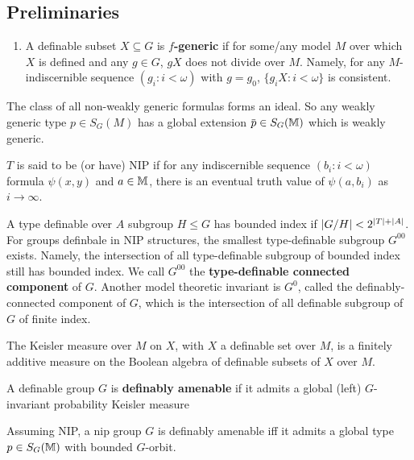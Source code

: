 \documentclass[11pt]{article}
\begin{document}
\subsection{Preliminaries}
\label{sec:org010ea45}
\begin{definition}[]
\begin{enumerate}
\item A definable subset \(X\subseteq G\) is  \textbf{\(f\)-generic} if for some/any model \(M\) over which \(X\) is
defined and any \(g\in G\), \(gX\) does not divide over \(M\). Namely, for
any \(M\)-indiscernible sequence \((g_i:i<\omega)\) with \(g=g_0\), \(\{g_iX:i<\omega\}\)  is consistent.
\end{enumerate}
\end{definition}

\begin{remark}
The class of all non-weakly generic formulas forms an ideal. So any weakly generic
type \(p\in S_G(M)\) has a global extension \(\barp\in S_G(\M)\) which is weakly generic.
\end{remark}

\(T\) is said to be (or have) NIP if for any indiscernible sequence \((b_i:i<\omega)\)
formula \(\psi(x,y)\) and \(a\in\mathbb{M}\), there is an eventual truth value of \(\psi(a,b_i)\) as \(i\to\infty\).

A type definable over \(A\) subgroup \(H\le G\) has bounded index
if \(\abs{G/H}<2^{\abs{T}+\abs{A}}\). For groups definbale in NIP structures, the smallest
type-definable subgroup \(G^{00}\) exists. Namely, the intersection of all type-definable
subgroup of bounded index still has bounded index. We call \(G^{00}\) the \textbf{type-definable
connected component} of \(G\). Another model theoretic invariant is \(G^0\), called the
definably-connected component of \(G\), which is the intersection of all definable subgroup
of \(G\) of finite index.

The Keisler measure over \(M\) on \(X\), with \(X\) a definable set over \(M\), is a finitely
additive measure on the Boolean algebra of definable subsets of \(X\) over \(M\).

A definable group \(G\) is \textbf{definably amenable} if it admits a global (left) \(G\)-invariant
probability Keisler measure

\begin{fact}[]
\label{fact1.3}
Assuming NIP, a nip group \(G\) is definably amenable iff it admits a global type \(p\in S_G(\mathbb{M})\)
with bounded \(G\)-orbit.
\end{fact}
\end{document}
